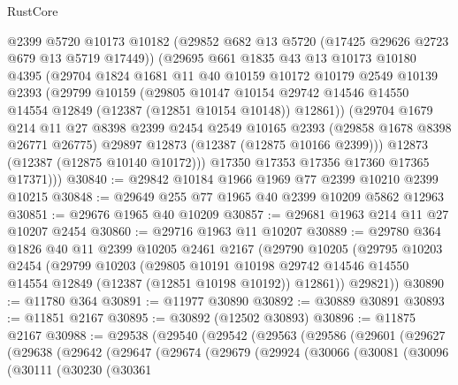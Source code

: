 \begin{lexlean}{RustCore}
\begin{coremodule}
        @2399
        @5720
        @10173
        @10182
        (@29852 @682 @13 @5720 (@17425 @29626 @2723 @679 @13 @5719 @17449))
        (@29695
          @661
          @1835
          @43
          @13
          @10173
          @10180
          @4395
          (@29704
            @1824
            @1681
            @11
            @40
            @10159
            @10172
            @10179
            @2549
            @10139
            @2393
            (@29799
              @10159
              (@29805
                @10147
                @10154
                @29742
                @14546
                @14550
                @14554
                @12849
                (@12387 (@12851 @10154 @10148))
                @12861))
            (@29704
              @1679
              @214
              @11
              @27
              @8398
              @2399
              @2454
              @2549
              @10165
              @2393
              (@29858 @1678 @8398 @26771 @26775)
              @29897
              @12873
              (@12387 (@12875 @10166 @2399)))
            @12873
            (@12387 (@12875 @10140 @10172)))
          @17350
          @17353
          @17356
          @17360
          @17365
          @17371)))
@30840 := @29842 @10184 @1966 @1969 @77 @2399 @10210 @2399 @10215
@30848 := @29649 @255 @77 @1965 @40 @2399 @10209 @5862 @12963
@30851 := @29676 @1965 @40 @10209
@30857 := @29681 @1963 @214 @11 @27 @10207 @2454
@30860 := @29716 @1963 @11 @10207
@30889 := @29780
    @364
    @1826
    @40
    @11
    @2399
    @10205
    @2461
    @2167
    (@29790
      @10205
      (@29795
        @10203
        @2454
        (@29799
          @10203
          (@29805
            @10191
            @10198
            @29742
            @14546
            @14550
            @14554
            @12849
            (@12387 (@12851 @10198 @10192))
            @12861))
        @29821))
@30890 := @11780 @364
@30891 := @11977 @30890
@30892 := @30889 @30891
@30893 := @11851 @2167
@30895 := @30892 (@12502 @30893)
@30896 := @11875 @2167
@30988 := @29538
    (@29540
      (@29542
        (@29563
          (@29586
            (@29601
              (@29627
                (@29638
                  (@29642
                    (@29647
                      (@29674
                        (@29679
                          (@29924
                            (@30066
                              (@30081
                                (@30096
                                  (@30111
                                    (@30230
                                      (@30361

\end{coremodule}
\end{lexlean}
